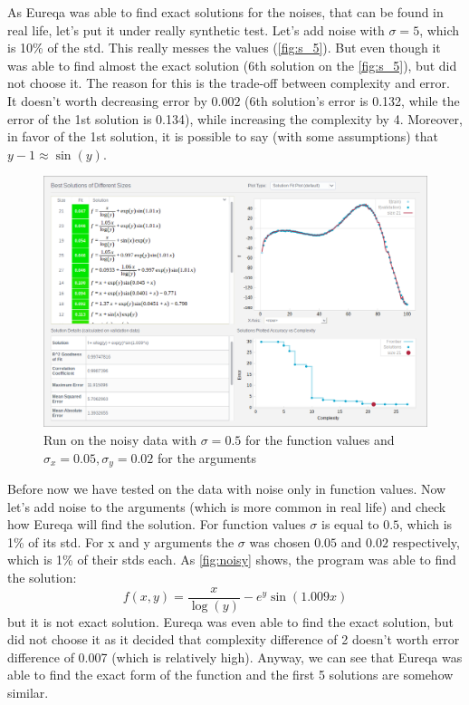 \documentclass[12pt]{article}
\begin{document}
    As Eureqa was able to find exact solutions for the noises, that can be found
    in real life, let's put it under really synthetic test. Let's add noise with
    $\sigma = 5$, which is 10\% of the std. This really messes the values
    (\autoref{fig:s_5}). But even though it was able to find almost the exact
    solution (6th solution on the \autoref{fig:s_5}), but did not choose it. The
    reason for this is the trade-off between complexity and error. It doesn't
    worth decreasing error by $0.002$ (6th solution's error is 0.132, while the
    error of the 1st solution is 0.134), while increasing the complexity by 4.
    Moreover, in favor of the 1st solution, it is possible to say (with some
    assumptions) that $y - 1 \approx \sin(y)$.

    \begin{figure}[H]
        \centering
        \includegraphics[width=\linewidth]{pics/sol_noisy.png}
        \caption{Run on the noisy data with $\sigma = 0.5$ for the function
            values and $\sigma_x = 0.05, \sigma_y = 0.02$ for the arguments}
        \label{fig:noisy}
    \end{figure}

    Before now we have tested on the data with noise only in function values.
    Now let's add noise to the arguments (which is more common in real life)
    and check how Eureqa will find the solution. For function values $\sigma$ is equal
    to $0.5$, which is 1\% of its std. For x and y arguments the $\sigma$ was
    chosen $0.05$ and $0.02$ respectively, which is 1\% of their stds each. As
    \autoref{fig:noisy} shows, the program was able to find the solution:
    $$f(x, y) = \frac{x}{\log(y)} - e^y\sin(1.009x)$$
    but it is not exact solution. Eureqa was even able to find the exact solution,
    but did not choose it as it decided that complexity difference of 2 doesn't
    worth error difference of 0.007 (which is relatively high). Anyway, we can
    see that Eureqa was able to find the exact form of the function and the first
    5 solutions are somehow similar.
\end{document}
